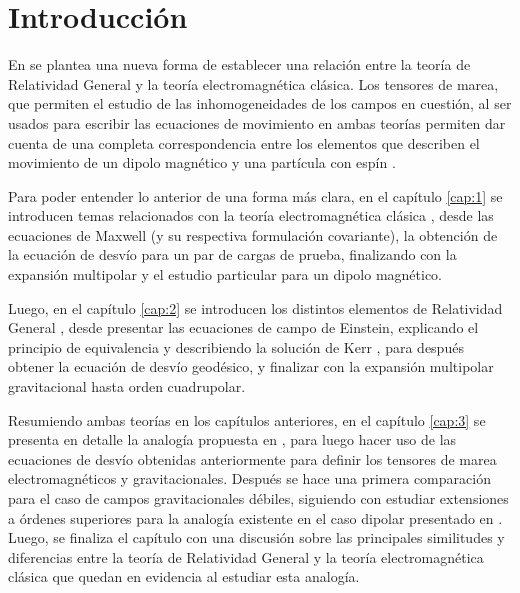 \chapter*{Introducci\'on}

En \cite{Costa-Herdeiro} se plantea una nueva forma de establecer una relación entre la teoría de Relatividad General y la teoría electromagnética clásica. Los tensores de marea, que permiten el estudio de las inhomogeneidades de los campos en cuestión, al ser usados para escribir las ecuaciones de movimiento en ambas teorías permiten dar cuenta de una completa correspondencia entre los elementos que describen el movimiento de un dipolo magnético y una partícula con espín \cite{Steinhoff-Puetzfeld}.

Para poder entender lo anterior de una forma más clara, en el capítulo \ref{cap:1} se introducen temas relacionados con la teoría electromagnética clásica \cite{gr2}, desde las ecuaciones de Maxwell (y su respectiva formulación covariante), la obtención de la ecuación de desvío para un par de cargas de prueba, finalizando con la expansión multipolar \cite{Dixon1,Dixon2,Dixon3} y el estudio particular para un dipolo magnético.

Luego, en el capítulo \ref{cap:2} se introducen los distintos elementos de Relatividad General \cite{gr1,inverno,Steven,Hans,Poisson}, desde presentar las ecuaciones de campo de Einstein, explicando el principio de equivalencia y describiendo la solución de Kerr \cite{Heinicke}, para después obtener la ecuación de desvío geodésico, y finalizar con la expansión multipolar gravitacional hasta orden cuadrupolar.

Resumiendo ambas teorías en los capítulos anteriores, en el capítulo \ref{cap:3} se presenta en detalle la analogía propuesta en \cite{Costa-Herdeiro}, para luego hacer uso de las ecuaciones de desvío obtenidas anteriormente para definir los tensores de marea electromagnéticos y gravitacionales. Después se hace una primera comparación para el caso de campos gravitacionales débiles, siguiendo con estudiar extensiones a órdenes superiores para la analogía existente en el caso dipolar presentado en \cite{Costa-Herdeiro}. Luego, se finaliza el capítulo con una discusión sobre las principales similitudes y diferencias entre la teoría de Relatividad General y la teoría electromagnética clásica que quedan en evidencia al estudiar esta analogía.

